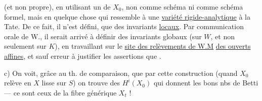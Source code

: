 
(et non propre), en utilisant un  de $X_0$, non comme schéma ni comme schéma formel, mais en quelque chose qui ressemble à une \uline{variété rigide-analytique} à la Tate. De ce fait, il n'est défini,  que des invariants \uline{locaux}. Par communication orale de W., il serait arrivé à définir des invariants globaux (sur $W$, et non seulement sur $K$), en travaillant  sur le \uline{site des relèvements de W.M}  \uline{des ouverts affines}, et sauf erreur à justifier les assertions que .

c) On voit, grâce au th. de comparaison, que par cette construction (quand $X_0$  relève en $X$ lisse sur $S$) on trouve des $H^i(X_0)$ qui donnent les bons nbs de Betti --- ce sont ceux de la fibre générique $X_t$ !

